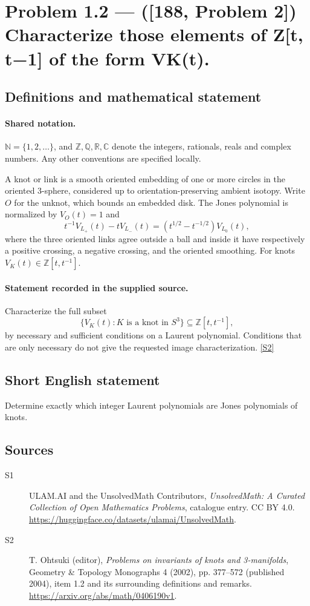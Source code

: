 \documentclass[11pt]{article}
\newcommand{\sref}[2]{\hyperlink{source:#1:#2}{[S#2]}}
\begin{document}
\section{Problem 1.2 — ([188, Problem 2]) Characterize those elements of Z[t, t−1] of the form VK(t).}\label{statement}

\subsection{Definitions and mathematical statement}

\paragraph{Shared notation.}$\mathbb N=\{1,2,\ldots\}$, and $\mathbb Z,\mathbb Q,\mathbb R,\mathbb C$ denote the integers, rationals, reals and complex numbers. Any other conventions are specified locally.


A knot or link is a smooth oriented embedding of one or more circles in the oriented $3$-sphere, considered up to orientation-preserving ambient isotopy. Write $O$ for the unknot, which bounds an embedded disk. The Jones polynomial is normalized by $V_O(t)=1$ and
\[t^{-1}V_{L_+}(t)-tV_{L_-}(t)=(t^{1/2}-t^{-1/2})V_{L_0}(t),\]
where the three oriented links agree outside a ball and inside it have respectively a positive crossing, a negative crossing, and the oriented smoothing. For knots $V_K(t)\in\mathbb Z[t,t^{-1}]$.
\paragraph{Statement recorded in the supplied source.}
Characterize the full subset
\[\{V_K(t):K\text{ is a knot in }S^3\}\subseteq\mathbb Z[t,t^{-1}],\]
by necessary and sufficient conditions on a Laurent polynomial. Conditions that are only necessary do not give the requested image characterization. \sref{statement}{2}
\subsection{Short English statement}
Determine exactly which integer Laurent polynomials are Jones polynomials of knots.
\subsection{Sources}
\begin{description}
\item[\hypertarget{source:statement:1}{S1}] ULAM.AI and the UnsolvedMath Contributors, \emph{UnsolvedMath: A Curated Collection of Open Mathematics Problems}, catalogue entry. CC BY 4.0. \url{https://huggingface.co/datasets/ulamai/UnsolvedMath}.
\item[\hypertarget{source:statement:2}{S2}] T. Ohtsuki (editor), \emph{Problems on invariants of knots and 3-manifolds}, Geometry \& Topology Monographs 4 (2002), pp. 377--572 (published 2004), item 1.2 and its surrounding definitions and remarks. \url{https://arxiv.org/abs/math/0406190v1}.
\end{description}
\label{end:statement}
\end{document}

